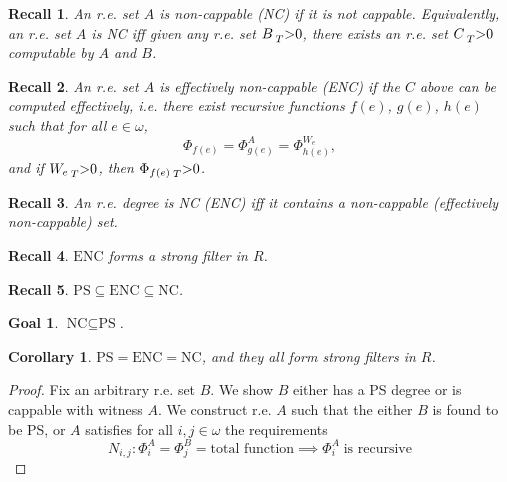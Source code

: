 \documentclass{article}
\newtheorem{recall}{Recall}[subsection]
\newtheorem{goal}{Goal}[subsection]
\newtheorem{corollary}{Corollary}[subsection]
\begin{document}
  \begin{recall}
    An r.e. set $A$ is non-cappable (NC) if it is not cappable.
    Equivalently, an r.e. set $A$ is NC iff given any r.e. set
    $B\prescript{}{T}{>}0$, there exists an r.e. set $C\prescript{}{T}{>}0$
    computable by $A$ and $B$.
  \end{recall}

  \begin{recall}
    An r.e. set $A$ is effectively non-cappable (ENC) if the $C$ above can
    be computed effectively, i.e. there exist recursive functions
    $f(e)$, $g(e)$, $h(e)$ such that for all $e\in\omega$,
    \[\Phi_{f(e)} =\Phi_{g(e)}^A =\Phi_{h(e)}^{W_e},\]
    and if $W_e\prescript{}{T}{>}0$, then $\Phi_{f(e)}\prescript{}{T}{>}0$.
  \end{recall}

  \begin{recall}
    An r.e. degree is NC (ENC) iff it contains a non-cappable (effectively
    non-cappable) set.
  \end{recall}

  \begin{recall}
    $\text{ENC}$ forms a strong filter in $R$.
  \end{recall}

  \begin{recall}
    $\text{PS} \subseteq \text{ENC} \subseteq \text{NC}$.
  \end{recall}

  \begin{goal}
    $\text{NC} \subseteq \text{PS}$.
  \end{goal}

  \begin{corollary}
    $\text{PS}=\text{ENC}=\text{NC}$, and they all form strong filters in
    $R$.
  \end{corollary}

  \begin{proof}
    Fix an arbitrary r.e. set $B$. We show $B$ either has a PS degree or is
    cappable with witness $A$. We construct r.e. $A$ such that the either
    $B$ is found to be PS, or $A$ satisfies for all $i,j\in\omega$ the
    requirements
    \begin{equation}
      N_{i,j}: \Phi_i^A=\Phi_j^B =\text{total function} \implies
      \Phi_i^A\; \text{is recursive}
      \label{eqn:cappable1}
    \end{equation}
  \end{proof}
\end{document}
